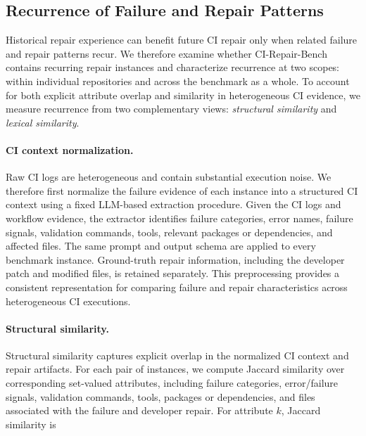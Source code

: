 
\subsection{Recurrence of Failure and Repair Patterns}
\label{sec:benchmark-recurrence}

Historical repair experience can benefit future CI repair only when
related failure and repair patterns recur. We therefore examine whether
CI-Repair-Bench contains recurring repair instances and characterize
recurrence at two scopes: within individual repositories and across the
benchmark as a whole. To account for both explicit attribute overlap
and similarity in heterogeneous CI evidence, we measure recurrence from
two complementary views: \emph{structural similarity} and
\emph{lexical similarity}.

\paragraph{CI context normalization.}
Raw CI logs are heterogeneous and contain substantial execution noise.
We therefore first normalize the failure evidence of each instance into
a structured CI context using a fixed LLM-based extraction procedure.
Given the CI logs and workflow evidence, the extractor identifies
failure categories, error names, failure signals, validation commands,
tools, relevant packages or dependencies, and affected files. The same
prompt and output schema are applied to every benchmark instance.
Ground-truth repair information, including the developer patch and
modified files, is retained separately. This preprocessing provides a
consistent representation for comparing failure and repair
characteristics across heterogeneous CI executions.

\paragraph{Structural similarity.}
Structural similarity captures explicit overlap in the normalized CI
context and repair artifacts. For each pair of instances, we compute
Jaccard similarity over corresponding set-valued attributes, including
failure categories, error/failure signals, validation commands, tools,
packages or dependencies, and files associated with the failure and
developer repair. For attribute $k$, Jaccard similarity is

